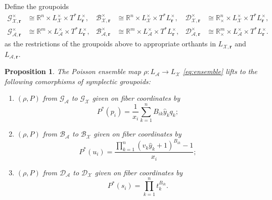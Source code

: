 \documentclass{amsart}
\newtheorem{proposition}[theorem]{Proposition}
\numberwithin{equation}{section}
\newcommand{\bfr}{{\boldsymbol{r}}}
\newcommand{\cA}{\mathcal{A}}
\newcommand{\cB}{\mathcal{B}}
\newcommand{\cD}{\mathcal{D}}
\newcommand{\cG}{\mathcal{G}}
\newcommand{\cX}{\mathcal{X}}
\newcommand{\RR}{\mathbb{R}}
\begin{document}
Define the groupoids 
\begin{align*}
  \cG^\times_{\cX,\bfr}&\cong\RR^n\times L^\times_\cX\times T^*L^\times_\bfr,& \cB^\times_{\cX,\bfr}&\cong\RR^n\times L^\times_\cX\times T^*L^\times_\bfr,& \cD^\times_{\cX,\bfr}&\cong\RR_\times^n\times L^\times_\cX\times T^*L^\times_\bfr,\\
  \cG^\times_{\cA,\bfr}&\cong\RR^m\times L^\times_\cA\times T^*L^\times_\bfr,& \cB^\times_{\cA,\bfr}&\cong\RR^m\times L^\times_\cA\times T^*L^\times_\bfr,& \cD^\times_{\cA,\bfr}&\cong\RR_\times^m\times L^\times_\cA\times T^*L^\times_\bfr.
\end{align*}
as the restrictions of the groupoids above to appropriate orthants in $L_{\cX,\bfr}$ and $L_{\cA,\bfr}$.
\begin{proposition} 
  \label{prop:ensemblegpd}
  The Poisson ensemble map $\rho:L_\cA\to L_\cX$ \eqref{eq:ensemble} lifts to the following comorphisms of symplectic groupoids:
  \begin{enumerate}
    \item $(\rho, P)$ from $\cG_\cA$ to $\cG_\cX$ given on fiber coordinates by
      \begin{equation} \label{eq:ensembleG}
	P^*\!\left(p_i\right) = \frac{1}{x_i}\sum_{k=1}^n B_{ik} \hat{y}_k q_k;
      \end{equation}
    \item $(\rho, P)$ from $\cB_\cA$ to $\cB_\cX$ given on fiber coordinates by
      \[P^*\!\left(u_i\right) = \frac{\prod_{k=1}^n (v_k\hat{y}_k+1)^{B_{ik}} - 1}{x_i};\]
    \item $(\rho, P)$ from $\cD_\cA$ to $\cD_\cX$ given on fiber coordinates by
      \[P^*\!\left(s_i \right) = \prod_{k=1}^n t_k^{B_{ik}}.\]
  \end{enumerate}
\end{proposition}
\end{document}
